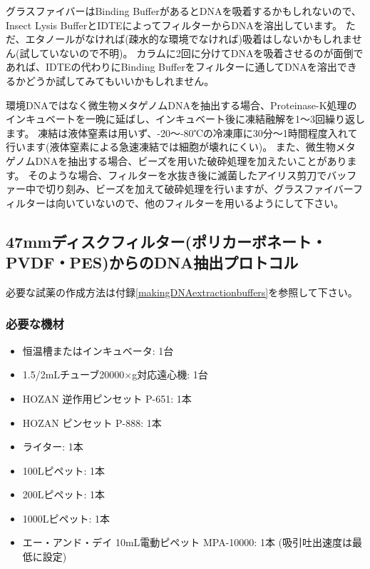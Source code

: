 \documentclass[titlepage,10pt,a4paper,uplatex]{jsbook}
\begin{document}
グラスファイバーはBinding BufferがあるとDNAを吸着するかもしれないので、Insect Lysis BufferとIDTEによってフィルターからDNAを溶出しています。
ただ、エタノールがなければ(疎水的な環境でなければ)吸着はしないかもしれません(試していないので不明)。
カラムに2回に分けてDNAを吸着させるのが面倒であれば、IDTEの代わりにBinding Bufferをフィルターに通してDNAを溶出できるかどうか試してみてもいいかもしれません。

環境DNAではなく微生物メタゲノムDNAを抽出する場合、Proteinase-K処理のインキュベートを一晩に延ばし、インキュベート後に凍結融解を1～3回繰り返します。
凍結は液体窒素は用いず、{-20}～{-80}℃の冷凍庫に30分～1時間程度入れて行います(液体窒素による急速凍結では細胞が壊れにくい)。
また、微生物メタゲノムDNAを抽出する場合、ビーズを用いた破砕処理を加えたいことがあります。
そのような場合、フィルターを水抜き後に滅菌したアイリス剪刀でバッファー中で切り刻み、ビーズを加えて破砕処理を行いますが、グラスファイバーフィルターは向いていないので、他のフィルターを用いるようにして下さい。

\subsection{47mmディスクフィルター(ポリカーボネート・PVDF・PES)からのDNA抽出プロトコル}

必要な試薬の作成方法は付録\ref{makingDNAextractionbuffers}を参照して下さい。

\subsubsection{必要な機材}
\begin{itemize}
\item 恒温槽またはインキュベータ: 1台
\item 1.5/2mLチューブ20000×g対応遠心機: 1台
\item HOZAN 逆作用ピンセット P-651: 1本
\item HOZAN ピンセット P-888: 1本
\item ライター: 1本
\item 100{\textmu}Lピペット: 1本
\item 200{\textmu}Lピペット: 1本
\item 1000{\textmu}Lピペット: 1本
\item エー・アンド・デイ 10mL電動ピペット MPA-10000: 1本 (吸引吐出速度は最低に設定)
\end{itemize}
\end{document}
